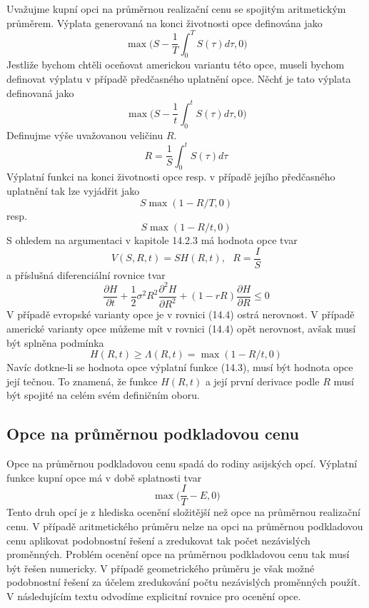 \documentclass[a4paper]{book}
\begin{document}
Uvažujme kupní opci na průměrnou realizační cenu se spojitým aritmetickým průměrem. Výplata generovaná na konci životnosti opce definována jako
\begin{equation*}
\max \Big( S - \frac{1}{T} \int_0^T S(\tau) d \tau, 0 \Big)
\end{equation*}
Jestliže bychom chtěli oceňovat americkou variantu této opce, museli bychom definovat výplatu v případě předčasného uplatnění opce. Něchť je tato výplata definovaná jako
\begin{equation}
\max \Big( S - \frac{1}{t} \int_0^t S(\tau) d \tau, 0 \Big)
\end{equation}
Definujme výše uvažovanou veličinu $R$.
\begin{equation}
R = \frac{1}{S}\int_0^t S(\tau) d \tau
\end{equation}
Výplatní funkci na konci životnosti opce resp. v případě jejího předčasného uplatnění tak lze vyjádřit jako
\begin{equation*}
S \max(1 - R/T, 0)
\end{equation*}
resp.
\begin{equation*}
S \max(1 - R/t, 0)
\end{equation*}
S ohledem na argumentaci v kapitole 14.2.3 má hodnota opce tvar
\begin{equation*}
V(S,R,t) = SH(R,t), ~~~ R = \frac{I}{S}
\end{equation*}
a příslušná diferenciální rovnice tvar
\begin{equation}
\frac{\partial H}{\partial t} + \frac{1}{2}\sigma^2R^2\frac{\partial^2 H}{\partial R^2} + (1 - rR)\frac{\partial H}{\partial R} \le 0
\end{equation}
V případě evropské varianty opce je v rovnici (14.4) ostrá nerovnost. V případě americké varianty opce můžeme mít v rovnici (14.4) opět nerovnost, avšak musí být splněna podmínka
\begin{equation*}
H(R,t) \ge \Lambda(R,t) = \max(1 - R/t, 0)
\end{equation*}
Navíc dotkne-li se hodnota opce výplatní funkce (14.3), musí být hodnota opce její tečnou. To znamená, že funkce $H(R,t)$ a její první derivace podle $R$ musí být spojité na celém svém definičním oboru.

\subsection{Opce na průměrnou podkladovou cenu}

Opce na průměrnou podkladovou cenu spadá do rodiny asijských opcí. Výplatní funkce kupní opce má v době splatnosti tvar
\begin{equation*}
\max \Big( \frac{I}{T} - E, 0\Big)
\end{equation*}
Tento druh opcí je z hlediska ocenění složitější než opce na průměrnou realizační cenu. V případě aritmetického průměru nelze na opci na průměrnou podkladovou cenu aplikovat podobnostní řešení a zredukovat tak počet nezávislých proměnných. Problém ocenění opce na průměrnou podkladovou cenu tak musí být řešen numericky. V případě geometrického průměru je však možné podobnostní řešení za účelem zredukování počtu nezávislých proměnných použít. V následujícím textu odvodíme explicitní rovnice pro ocenění opce.
\end{document}
